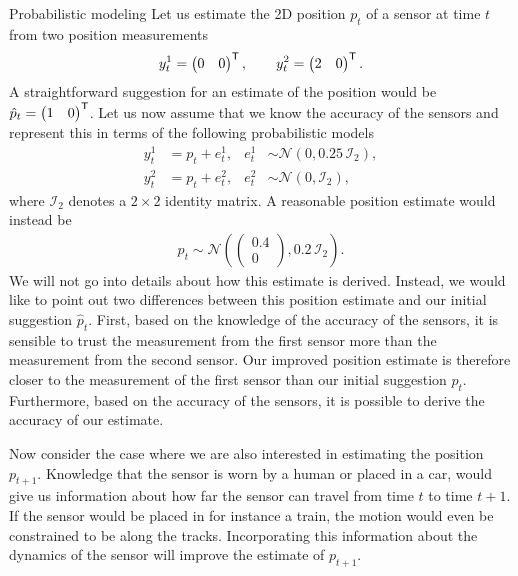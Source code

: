 \begin{myexample}{Probabilistic modeling}%
\label{ex:models-probModeling}%
Let us estimate the 2D position $p_t$ of a sensor at time $t$ from two position measurements
\begin{align*}
y_t^1 = \begin{pmatrix} 0 & 0 \end{pmatrix}^{\mathsf{T}}, \qquad y_t^2 = \begin{pmatrix} 2 & 0 \end{pmatrix}^{\mathsf{T}}.
\end{align*}
A straightforward suggestion for an estimate of the position would be $\hat{p}_t = \begin{pmatrix} 1 & 0 \end{pmatrix}^{\mathsf{T}}$. Let us now assume that we know the accuracy of the sensors and represent this in terms of the following probabilistic models 
\begin{align*}
y_t^1 &= p_t + e_t^1, &e_t^1 &\sim \mathcal{N}( 0, 0.25 \, \mathcal{I}_2 ), \\
y_t^2 &= p_t + e_t^2, &e_t^2 &\sim \mathcal{N}( 0,\mathcal{I}_2 ),
\end{align*}
where $\mathcal{I}_2$ denotes a $2 \times 2$ identity matrix. A reasonable position estimate would instead be
\begin{align*}
p_t \sim \mathcal{N} \left( \begin{pmatrix} 0.4 \\ 0 \end{pmatrix}, 0.2 \, \mathcal{I}_2 \right) .
\end{align*}
We will not go into details about how this estimate is derived. Instead, we would like to point out two differences between this position estimate and our initial suggestion $\hat{p}_t$. First, based on the knowledge of the accuracy of the sensors, it is sensible to trust the measurement from the first sensor more than the measurement from the second sensor. Our improved position estimate is therefore closer to the measurement of the first sensor than our initial suggestion $\hat{p}_t$. Furthermore, based on the accuracy of the sensors, it is possible to derive the accuracy of our estimate. 

Now consider the case where we are also interested in estimating the position $p_{t+1}$. Knowledge that the sensor is worn by a human or placed in a car, would give us information about how far the sensor can travel from time $t$ to time $t+1$. If the sensor would be placed in for instance a train, the motion would even be constrained to be along the tracks. Incorporating this information about the dynamics of the sensor will improve the estimate of $p_{t+1}$.
\end{myexample}

